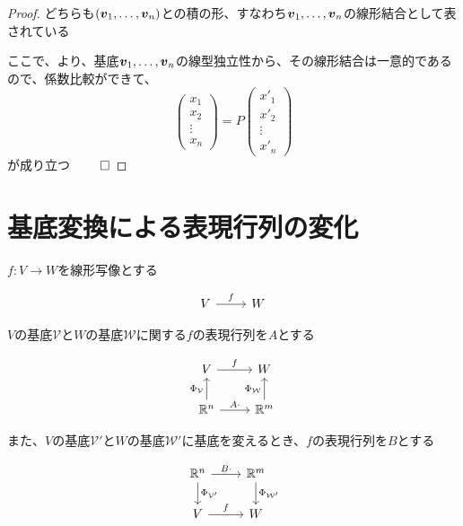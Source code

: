 \documentclass[../../../topic_linear-algebra]{subfiles}
\begin{document}
\begin{proof}
  どちらも$(\vb*{v}_1, \ldots, \vb*{v}_n)$との積の形、すなわち$\vb*{v}_1, \ldots, \vb*{v}_n$の線形結合として表されている

  ここで、より、基底$\vb*{v}_1, \ldots, \vb*{v}_n$の線型独立性から、その線形結合は一意的であるので、係数比較ができて、
  \begin{equation*}
    \begin{pmatrix}
      x_1    \\
      x_2    \\
      \vdots \\
      x_n
    \end{pmatrix} = P \begin{pmatrix}
      x'_1   \\
      x'_2   \\
      \vdots \\
      x'_n
    \end{pmatrix}
  \end{equation*}
  が成り立つ $\qed$
\end{proof}

\sectionline
\section{基底変換による表現行列の変化}

$f\colon V \to W$を線形写像とする

\begin{equation*}
  \begin{tikzcd}
    V \arrow[r,"f"] & W
  \end{tikzcd}
\end{equation*}

$V$の基底$\mathcal{V}$と$W$の基底$\mathcal{W}$に関する$f$の表現行列を$A$とする

\begin{equation*}
  \begin{tikzcd}
    V \arrow[r,"f"] & W \\
    \mathbb{R}^n \arrow[u,"{\Phi_{\mathcal{V}}}"] \arrow[r,"A\cdot"] & \mathbb{R}^m \arrow[u,"{\Phi_{\mathcal{W}}}"]
  \end{tikzcd}
\end{equation*}

また、$V$の基底$\mathcal{V}'$と$W$の基底$\mathcal{W}'$に基底を変えるとき、$f$の表現行列を$B$とする

\begin{equation*}
  \begin{tikzcd}
    \mathbb{R}^n \arrow[d,"{\Phi_{\mathcal{V}'}}"] \arrow[r,"B\cdot"] & \mathbb{R}^m \arrow[d,"{\Phi_{\mathcal{W}'}}"] \\
    V \arrow[r,"f"] & W
  \end{tikzcd}
\end{equation*}
\end{document}

